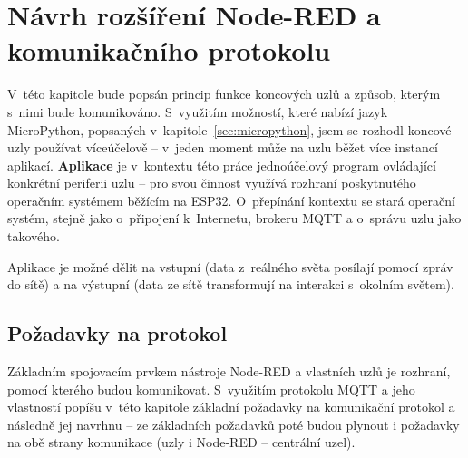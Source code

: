 \chapter{Návrh rozšíření Node-RED a komunikačního protokolu}
\label{ch:protokol}

V~této kapitole bude popsán princip funkce koncových uzlů a způsob, kterým s~nimi bude komunikováno.
S~využitím možností, které nabízí jazyk MicroPython, popsaných v~kapitole~\ref{sec:micropython}, jsem se rozhodl
koncové uzly používat víceúčelově -- v~jeden moment může na uzlu běžet více instancí aplikací.
\textbf{Aplikace} je v~kontextu této práce jednoúčelový program ovládající konkrétní periferii uzlu -- pro svou činnost
využívá rozhraní poskytnutého operačním systémem běžícím na ESP32.
O~přepínání kontextu se stará operační systém, stejně jako o~připojení k~Internetu, brokeru MQTT a o~správu uzlu jako
takového.

Aplikace je možné dělit na vstupní (data z~reálného světa posílají pomocí zpráv do sítě) a na výstupní (data ze sítě
transformují na interakci s~okolním světem).

\section{Požadavky na protokol}\label{sec:pozadavky-na-protokol}
Základním spojovacím prvkem nástroje Node-RED a vlastních uzlů je rozhraní, pomocí kterého budou
komunikovat.
S~využitím protokolu MQTT a jeho vlastností popíšu v~této kapitole základní požadavky na komunikační protokol a
následně jej navrhnu -- ze základních požadavků poté budou plynout i požadavky na obě strany komunikace (uzly i
Node-RED -- centrální uzel).

